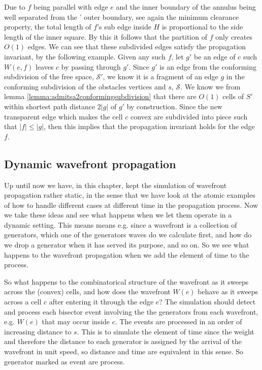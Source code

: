 Due to $f$ being parallel with edge $e$ and the inner boundary of the annulus being well separated from the '
outer boundary, see again the minimum clearance property, the total length of $f$'s sub edge inside $H$ is 
proportional to the side length of the inner square. By this it follows that the partition of $f$ only creates 
$O(1)$ edges. We can see that these subdivided edges satisfy the propagation invariant, by the following example. 
Given any such $f$, let $g'$ be an edge of $c$ such $W(e,f)$ leaves $c$ by passing through $g'$. Since $g'$ is an 
edge from the conforming subdivision of the free space, $\mathcal{S}'$, we know it is a fragment of an edge $g$ in 
the conforming subdivision of the obstacles vertices and $s$, $\mathcal{S}$. We know we from lemma 
\ref{lemma:admitsa2conformingsubdivision} that there are $O(1)$ cells of $S'$ within shortest path distance $2|g|$ 
of $g'$ by construction. Since the new transparent edge which makes the cell $c$ convex are subdivided into piece 
such that $|f| \leq |g|$, then this implies that the propagation invariant holds for the edge $f$.

\subsection{Dynamic wavefront propagation}

Up until now we have, in this chapter, kept the simulation of wavefront propagation rather static, in the sense that
we have look at the atomic examples of how to handle different cases at different time in the propagation process.
Now we take these ideas and see what happens when we let them operate in a dynamic setting. This means means e.g. 
since a wavefront is a collection of generators, which one of the generators waves do we calculate first, and how do
we drop a generator when it has served its purpose, and so on. So we see what happens to the wavefront propagation 
when we add the element of time to the process.

So what happens to the combinatorical structure of the wavefront as it sweeps across the (convex) cells, and how 
does the wavefront $W(e)$ behave as it sweeps across a cell $c$ after entering it through the edge $e$? The 
simulation should detect and process each bisector event involving the the generators from each wavefront, e.g. 
$W(e)$ that may occur inside $c$. The events are processed in an order of increasing distance to $s$. This is to 
simulate the element of time since the weight and therefore the distance to each generator is assigned by the 
arrival of the wavefront in unit speed, so distance and time are equivalent in this sense. So generator marked as 
event are process.

